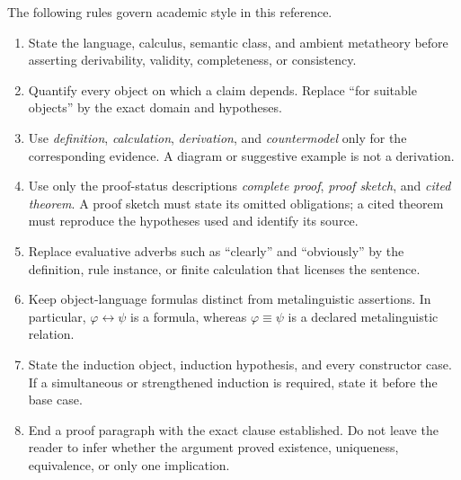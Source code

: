 The following rules govern academic style in this reference.
\begin{enumerate}
  \item State the language, calculus, semantic class, and ambient metatheory
        before asserting derivability, validity, completeness, or consistency.
  \item Quantify every object on which a claim depends.  Replace ``for suitable
        objects'' by the exact domain and hypotheses.
  \item Use \emph{definition}, \emph{calculation}, \emph{derivation}, and
        \emph{countermodel} only for the corresponding evidence.  A diagram or
        suggestive example is not a derivation.
  \item Use only the proof-status descriptions \emph{complete proof},
        \emph{proof sketch}, and \emph{cited theorem}.  A proof sketch must
        state its omitted obligations; a cited theorem must reproduce the
        hypotheses used and identify its source.
  \item Replace evaluative adverbs such as ``clearly'' and ``obviously'' by the
        definition, rule instance, or finite calculation that licenses the
        sentence.
  \item Keep object-language formulas distinct from metalinguistic assertions.
        In particular, \(\varphi\leftrightarrow\psi\) is a formula, whereas
        \(\varphi\equiv\psi\) is a declared metalinguistic relation.
  \item State the induction object, induction hypothesis, and every constructor
        case.  If a simultaneous or strengthened induction is required, state
        it before the base case.
  \item End a proof paragraph with the exact clause established.  Do not leave
        the reader to infer whether the argument proved existence, uniqueness,
        equivalence, or only one implication.
\end{enumerate}

